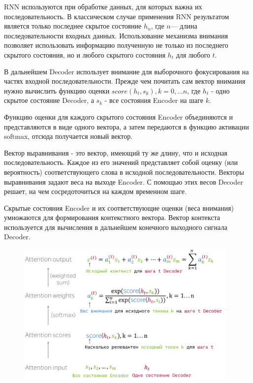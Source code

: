     RNN используются при обработке данных, для которых важна их последовательность. В классическом случае применения RNN результатом является только последнее скрытое состояние $h_n$, где $n$— длина последовательности входных данных. Использование механизма внимания позволяет использовать информацию полученную не только из последнего скрытого состояния, но и любого скрытого состояния $h_t$ для любого $t$.
    
    В дальнейшем Decoder использует внимание для выборочного фокусирования на частях входной последовательности. Прежде чем почитать сам вектор внимания нужно вычислить функцию оценки $score(h_t, s_k), k = 0, ... n$, где $h_t$ - одно скрытое состояние Decoder, а $s_k$ - все состояния Encoder на шаге $k$.
	
	Функцию оценки для каждого скрытого состояния Encoder объединяются и представляются в виде одного вектора, а затем передаются в функцию активации softmax, отсюда получается новый вектор. 
	
	Вектор выравнивания - это вектор, имеющий ту же длину, что и исходная последовательность. Каждое из его значений представляет собой оценку (или вероятность) соответствующего слова в исходной последовательности. Векторы выравнивания задают веса на выходе Encoder. С помощью этих весов Decoder решает, на чем сосредоточиться на каждом временном шаге.
	
	Скрытые состояния Encoder и их соответствующие оценки (веса внимания) умножаются для формирования контекстного вектора. Вектор контекста используется для вычисления в дальнейшем конечного выходного сигнала Decoder.
		
	\begin{figure}[ht!]
		\centering
		\captionsetup{justification=centering}
		\includegraphics[height=70mm]{img/Attetion.png}
	\end{figure}
	
